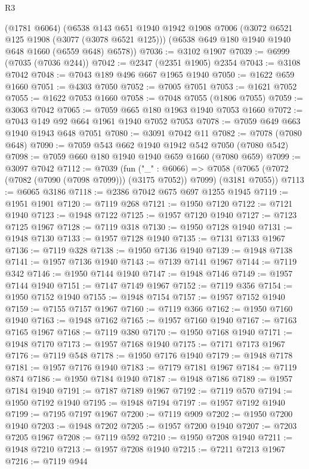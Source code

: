 \begin{lexlean}{R3}
\begin{coremodule}
    (@1781 @6064)
    (@6538
      @143
      @651
      @1940
      @1942
      @1908
      @7006
      (@3072 @6521 @125 @1908 (@3077 (@3078 @6521 @125)))
      (@6538 @649 @180 @1940 @1940 @648 @1660 (@6559 @648) @6578))
@7036 := @3102 @1907
@7039 := @6999 (@7035 (@7036 @244))
@7042 := @2347 (@2351 @1905) @2354
@7043 := @3108 @7042
@7048 := @7043 @189 @496 @667 @1965 @1940
@7050 := @1622 @659 @1660
@7051 := @4303 @7050
@7052 := @7005 @7051
@7053 := @1621 @7052
@7055 := @1622 @7053 @1660
@7058 := @7048 @7055 (@1806 @7055)
@7059 := @3063 @7042
@7065 := @7059 @665 @180 @1963 @1940 @7053 @1660
@7072 := @7043 @149 @92 @664 @1961 @1940 @7052 @7053
@7078 := @7059 @649 @663 @1940 @1943 @648 @7051
@7080 := @3091 @7042 @11
@7082 := @7078 (@7080 @648)
@7090 := @7059 @543 @662 @1940 @1942 @542 @7050 (@7080 @542)
@7098 := @7059 @660 @180 @1940 @1940 @659 @1660 (@7080 @659)
@7099 := @3097 @7042
@7112 := @7039
    (fun ("_" : @6066) =>
    @7058 (@7065 (@7072 (@7082 (@7090 (@7098 @7099))) (@3175 @7052)) @7099) (@3181 @7055))
@7113 := @6065 @3186
@7118 := @2386 @7042 @675 @697 @1255 @1945
@7119 := @1951 @1901
@7120 := @7119 @268
@7121 := @1950 @7120
@7122 := @7121 @1940
@7123 := @1948 @7122
@7125 := @1957 @7120 @1940
@7127 := @7123 @7125 @1967
@7128 := @7119 @318
@7130 := @1950 @7128 @1940
@7131 := @1948 @7130
@7133 := @1957 @7128 @1940
@7135 := @7131 @7133 @1967
@7136 := @7119 @328
@7138 := @1950 @7136 @1940
@7139 := @1948 @7138
@7141 := @1957 @7136 @1940
@7143 := @7139 @7141 @1967
@7144 := @7119 @342
@7146 := @1950 @7144 @1940
@7147 := @1948 @7146
@7149 := @1957 @7144 @1940
@7151 := @7147 @7149 @1967
@7152 := @7119 @356
@7154 := @1950 @7152 @1940
@7155 := @1948 @7154
@7157 := @1957 @7152 @1940
@7159 := @7155 @7157 @1967
@7160 := @7119 @366
@7162 := @1950 @7160 @1940
@7163 := @1948 @7162
@7165 := @1957 @7160 @1940
@7167 := @7163 @7165 @1967
@7168 := @7119 @380
@7170 := @1950 @7168 @1940
@7171 := @1948 @7170
@7173 := @1957 @7168 @1940
@7175 := @7171 @7173 @1967
@7176 := @7119 @548
@7178 := @1950 @7176 @1940
@7179 := @1948 @7178
@7181 := @1957 @7176 @1940
@7183 := @7179 @7181 @1967
@7184 := @7119 @874
@7186 := @1950 @7184 @1940
@7187 := @1948 @7186
@7189 := @1957 @7184 @1940
@7191 := @7187 @7189 @1967
@7192 := @7119 @570
@7194 := @1950 @7192 @1940
@7195 := @1948 @7194
@7197 := @1957 @7192 @1940
@7199 := @7195 @7197 @1967
@7200 := @7119 @909
@7202 := @1950 @7200 @1940
@7203 := @1948 @7202
@7205 := @1957 @7200 @1940
@7207 := @7203 @7205 @1967
@7208 := @7119 @592
@7210 := @1950 @7208 @1940
@7211 := @1948 @7210
@7213 := @1957 @7208 @1940
@7215 := @7211 @7213 @1967
@7216 := @7119 @944

\end{coremodule}
\end{lexlean}
